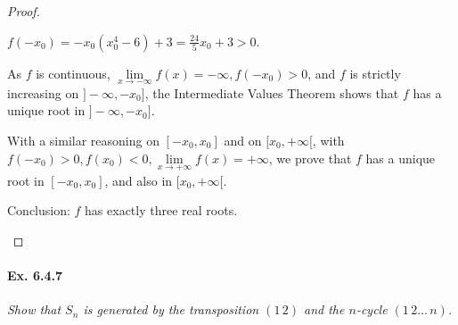 \documentclass[11pt,a4paper]{article}
\begin{document}
\begin{proof}
\begin{enumerate}
$f(-x_0) = -x_0(x_0^4-6)+3 = \frac{24}{5}x_0+3> 0$.

As $f$ is continuous, $\lim\limits_{x\to -\infty}f(x) = -\infty, f(-x_0)>0$, and $f$ is strictly increasing on $]-\infty, -x_0]$, the Intermediate Values Theorem shows that $f$ has a unique root in $]-\infty, -x_0]$.

With a similar reasoning on  $[-x_0,x_0]$ and on $[x_0,+\infty[$, with $f(-x_0)>0,f(x_0)<0,\lim\limits_{x\to +\infty}f(x) = +\infty$, we prove that $f$ has a unique root in $[-x_0,x_0]$, and also in $[x_0,+\infty[$.

Conclusion: $f$ has exactly three real roots.
\end{enumerate}
\end{proof}

\paragraph{Ex. 6.4.7}

{\it Show that $S_n$ is generated by the transposition $(1\, 2)$ and the $n$-cycle $(1\, 2 \ldots\, n)$.
}
\end{document}
